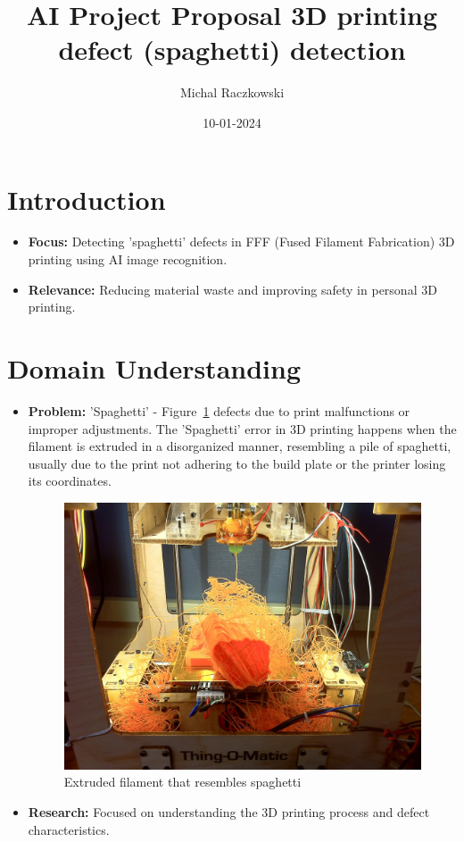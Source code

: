 \documentclass[12pt,a4paper]{article}
\title{\textbf{AI Project Proposal 3D printing defect (spaghetti) detection }}
\author{Michal Raczkowski}
\date{10-01-2024}
\begin{document}
\maketitle
\thispagestyle{empty} %

\newpage
\tableofcontents
\newpage

\setcounter{page}{1} %

\section{Introduction}
\begin{itemize}
    \item \textbf{Focus:} Detecting 'spaghetti' defects in FFF (Fused Filament Fabrication) 3D printing using AI image recognition.
    \item \textbf{Relevance:} Reducing material waste and improving safety in personal 3D printing.
\end{itemize}

\section{Domain Understanding}
\begin{itemize}
    \item \textbf{Problem:} 'Spaghetti' - Figure~\ref{fig:spaghetti3D} defects due to print malfunctions or improper adjustments.
    The 'Spaghetti' error in 3D printing happens when the filament is extruded in a disorganized manner, resembling a pile of spaghetti, usually due to the print not adhering to the build plate or the printer losing its coordinates.
    \begin{figure}[h]
    \centering
    \includegraphics[width=0.5\linewidth]{spaghetti3D.jpg}
    \caption{Extruded filament that resembles spaghetti}
    \label{fig:spaghetti3D}
    \end{figure}

    \item \textbf{Research:} Focused on understanding the 3D printing process and defect characteristics.
\end{itemize}
\end{document}
